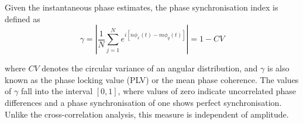 \documentclass[]{article}
\begin{document}
Given the instantaneous phase estimates, the phase synchronisation index is defined as
\begin{equation}
\gamma = |\frac{1}{N}\sum_{j=1}^N e^{i[n\phi_x(t)-m\phi_y(t)]}| =
1-CV
\end{equation}

where $CV$ denotes the circular variance of an angular distribution,
and $\gamma$ is also known as the phase locking value (PLV) or the
mean phase coherence. The values of $\gamma$ fall into the
interval $[0,1]$, where values of zero indicate uncorrelated phase
differences and a phase synchronisation of one shows perfect
synchronisation. Unlike the cross-correlation analysis, this measure is independent of amplitude.\\

%
%








\end{document}
